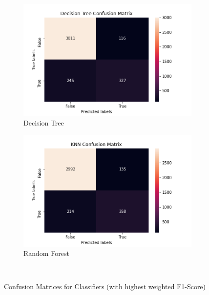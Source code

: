 \documentclass{article}
\begin{document}
\begin{figure}[H]
\begin{subfigure}{.5\linewidth}
\includegraphics[scale=0.4]{DecisionTree_confusionMatrix.png}
\caption{Decision Tree}
\label{fig:dtMatrix}
\end{subfigure}%
\begin{subfigure}{.5\linewidth}
\centering
\includegraphics[scale=0.4]{RandomForest_confusionMatrix.png}
\caption{Random Forest}
\label{fig:rfMatrix}
\end{subfigure}\\[1ex]
\caption{Confusion Matrices for Classifiers (with highest weighted F1-Score)}
\label{fig:confusionMatrix}
\end{figure}
\end{document}
